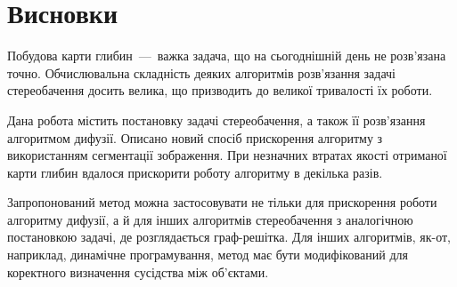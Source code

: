 \chapter*{Висновки}

Побудова карти глибин~---~важка задача, що
на сьогоднішній день не розв'язана точно.
Обчислювальна складність деяких алгоритмів розв'язання задачі стереобачення
досить велика, що призводить до великої тривалості їх роботи.

Дана робота містить постановку задачі стереобачення,
а також її розв'язання алгоритмом дифузії.
Описано новий спосіб прискорення алгоритму
з використанням сегментації зображення.
При незначних втратах якості отриманої карти глибин вдалося прискорити
роботу алгоритму в декілька разів.

Запропонований метод можна застосовувати
не тільки для прискорення роботи алгоритму дифузії,
а й для інших алгоритмів стереобачення з аналогічною постановкою задачі,
де розглядається граф-решітка.
Для інших алгоритмів, як-от, наприклад, динамічне програмування,
метод має бути модифікований для коректного визначення сусідства між об'єктами.

